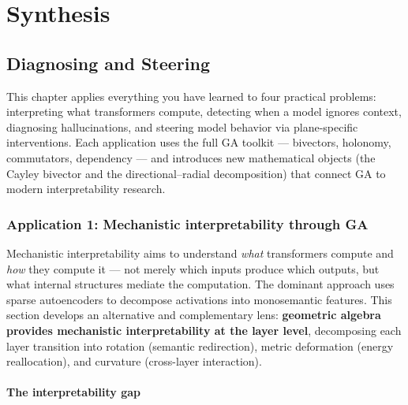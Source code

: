 \documentclass[11pt, twoside, openright]{memoir}
\numberwithin{equation}{chapter}
\begin{document}
\part{Synthesis}
\label{part:synthesis}


\chapter{Diagnosing and Steering}
\label{chap:applications}

\begin{whycare}
This chapter applies everything you have learned to four practical
problems: interpreting what transformers compute, detecting when a model
ignores context, diagnosing hallucinations, and steering model behavior
via plane-specific interventions.  Each application uses the full GA
toolkit --- bivectors, holonomy, commutators, dependency --- and
introduces new mathematical objects (the Cayley bivector and the
directional--radial decomposition) that connect GA to modern
interpretability research.
\end{whycare}

\section{Application 1: Mechanistic interpretability through GA}
\label{sec:mech-interp}

Mechanistic interpretability aims to understand \emph{what}
transformers compute and \emph{how} they compute it --- not merely
which inputs produce which outputs, but what internal structures
mediate the computation.  The dominant approach uses sparse
autoencoders to decompose activations into monosemantic features.
This section develops an alternative and complementary lens:
\textbf{geometric algebra provides mechanistic interpretability at the
layer level}, decomposing each layer transition into rotation
(semantic redirection), metric deformation (energy reallocation),
and curvature (cross-layer interaction).

\subsection{The interpretability gap}
\end{document}
